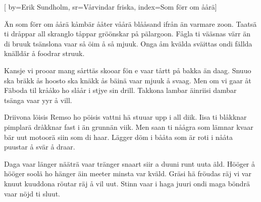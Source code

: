 
[
  by={Erik Sundholm},
  sr={Vårvindar friska},
  index={Som förr om åårä}]
  
\beginverse*
Än som förr om åårä
kåmbär ååter våårä
blååsand ifrån än varmare zoon.
Taatsä ti dråppar
all skranglo tåppar
gröönskar på pälargoon.
Fågla ti vääsnas värr än di bruuk
tsänslona vaar så öim å så mjuuk.
Onga åm kvälda
sväittas ondi fällda
knälldär å foodrar struuk.
\endverse

\beginverse*
Kansje vi prooar
mang sårttäs skooar
fön e vaar tårtt på bakka än daag.
Snuuo ska bräkk ås
hoosto ska knäkk ås
bäinä vaar mjuuk å svaag.
Men om vi gaar åt Fäboda til
krååko ho slåår i stjye sin drill.
Takkona lambar
äinriisi dambar
tsänga vaar yyr å vill.
\endverse

\beginverse*
Driivona löisis
Remso ho pöisis
vattni hä stuuar upp i all diik.
Iisa ti blåkknar
pimplarä dråkknar
fast i än grunnän viik.
Men saan ti nåågra som lämnar kvaar
bär uut motoorä siin som di haar.
Lägger döm i bååta
som är roti i nååta
puustar å svär å draar.
\endverse

\beginverse*
Daga vaar länger
nääträ vaar tränger
snaart siir a duuni runt uuta äld.
Hööger å hööger
soolä ho hänger
äin meeter minsta var kväld.
Gräsi hä fröudas räj vi var knuut
kuuddona röutar räj å vil uut.
Stinn vaar i haga
juuri ondi maga
böndrä vaar nöjd ti sluut.
\endverse
\endsong